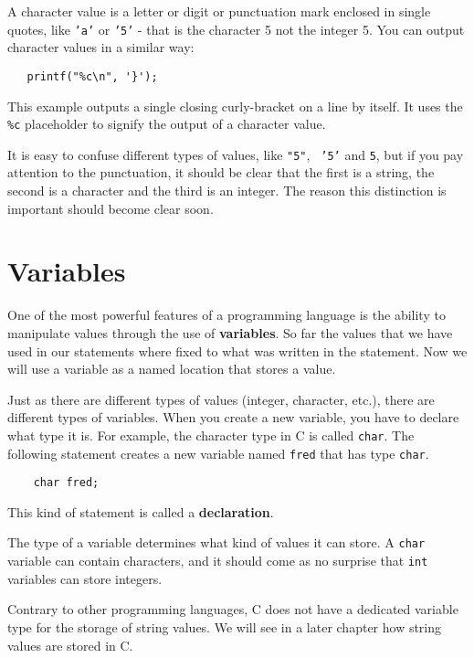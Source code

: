 A character value is a letter or digit or punctuation mark
enclosed in single quotes, like {\tt 'a'} or {\tt '5'} - that is the character 5 not the integer 5.
You can output character values in a similar way:

\begin{verbatim}
   printf("%c\n", '}');
\end{verbatim}
%
This example outputs a single closing curly-bracket on a line
by itself. It uses the {\tt \%c} placeholder to signify the output of a character
value.

It is easy to confuse different types of values, like {\tt "5"}, {\tt
'5'} and {\tt 5}, but if you pay attention to the punctuation, it
should be clear that the first is a string, the second is a character
and the third is an integer.  The reason this distinction is important
should become clear soon.

\section {Variables}

One of the most powerful features of a programming language is the
ability to manipulate values through the use of {\bf variables}.  So far
the values that we have used in our statements where fixed to what 
was written in the statement. Now we will use a variable as a named 
location that stores a value.  

Just as there are different types of values (integer, character,
etc.), there are different types of variables.  When you create a new
variable, you have to declare what type it is.  For example, the
character type in C is called {\tt char}.  The following statement
creates a new variable named {\tt fred} that has type {\tt char}.

\begin{verbatim}
    char fred;
\end{verbatim}
%
This kind of statement is called a {\bf declaration}.

The type of a variable determines what kind of values it can
store.  A {\tt char} variable can contain characters, and it should
come as no surprise that {\tt int} variables can store integers.

Contrary to other programming languages, C does not have a 
dedicated variable type for the storage of string values. We will see in
a later chapter how string values are stored in C. 

